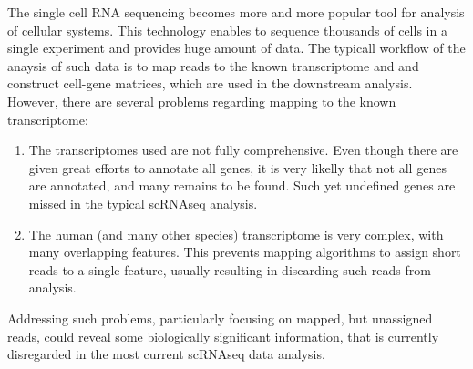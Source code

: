 The single cell RNA sequencing becomes more and more popular tool for analysis of cellular systems.
This technology enables to sequence thousands of cells in a single experiment and provides huge amount of data.
The typicall workflow of the anaysis of such data is to map reads to the known transcriptome and and construct cell-gene matrices,
which are used in the downstream analysis.
However, there are several problems regarding mapping to the known transcriptome:

\begin{enumerate}
  \item The transcriptomes used are not fully comprehensive.
  Even though there are given great efforts to annotate all genes, it is very likelly that not all genes are annotated,
  and many remains to be found.
  Such yet undefined genes are missed in the typical scRNAseq analysis.
  \item The human (and many other species) transcriptome is very complex, with many overlapping features.
  This prevents mapping algorithms to assign short reads to a single feature, usually resulting in discarding such reads from analysis.
\end{enumerate}

Addressing such problems, particularly focusing on mapped, but unassigned reads, could reveal some biologically significant information,
that is currently disregarded in the most current scRNAseq data analysis.
